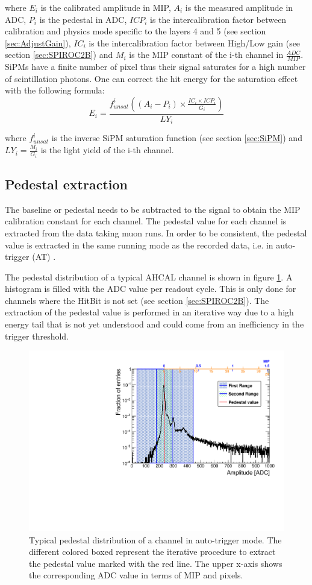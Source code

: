 where $E_i$ is the calibrated amplitude in MIP, $A_i$ is the measured amplitude in ADC, $P_i$ is the pedestal in ADC, $ICP_i$ is the intercalibration factor between calibration and physics mode specific to the layers 4 and 5 (see section \ref{sec:AdjustGain}), $IC_i$ is the intercalibration factor between High/Low gain (see section \ref{sec:SPIROC2B}) and $M_{i}$ is the MIP constant of the i-th channel in $\frac{ADC}{MIP}$. SiPMs have a finite number of pixel thus their signal saturates for a high number of scintillation photons. One can correct the hit energy for the saturation effect with the following formula:
\begin{equation}
	E_i = \frac{f^{i}_{unsat}( (A_i - P_i) \times \frac{IC_i \times ICP_i}{G_i} )}{LY_{i}}
\end{equation}

where $f^{i}_{unsat}$ is the inverse SiPM saturation function (see section \ref{sec:SiPM}) and $LY_{i} = \frac{M_{i}}{G_i}$ is the light yield of the i-th channel.

\subsection{Pedestal extraction}

The baseline or pedestal needs to be subtracted to the signal to obtain the MIP calibration constant for each channel. The pedestal value for each channel is extracted from the data taking muon runs. In order to be consistent, the pedestal value is extracted in the same running mode as the recorded data, i.e. in auto-trigger (AT) \cite{Hermberg:2015gaa, SarahMaster}.

The pedestal distribution of a typical AHCAL channel is shown in figure \ref{fig:PedExtraction}. A histogram is filled with the ADC value per readout cycle. This is only done for channels where the HitBit is not set (see section \ref{sec:SPIROC2B}). The extraction of the pedestal value is performed in an iterative way due to a high energy tail that is not yet understood and could come from an inefficiency in the trigger threshold.

\begin{figure}[htbp!]
	\centering
	\includegraphics[width=0.6\linewidth]{../Thesis_Plots/EnergyCalib/Plots/PedestalExtractionExample.pdf}
	\caption{Typical pedestal distribution of a channel in auto-trigger mode. The different colored boxed represent the iterative procedure to extract the pedestal value marked with the red line. The upper x-axis shows the corresponding ADC value in terms of MIP and pixels.} \label{fig:PedExtraction}
\end{figure}

